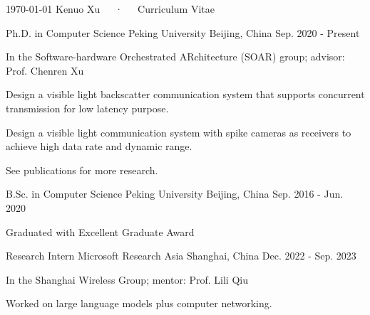 \documentclass[11pt, a4paper]{awesome-cv}
\begin{document}
\makecvheader

\makecvfooter
  {\today}
  {Kenuo Xu~~~·~~~Curriculum Vitae}
  {\thepage}



\begin{cventries}
	
	\cventry
	{Ph.D. in Computer Science}
	{Peking University}
	{Beijing, China}
	{Sep. 2020 - Present}
	{
		\begin{cvitems} %
			\item {In the Software-hardware Orchestrated ARchitecture (SOAR) group; advisor: Prof. Chenren Xu}
			\item {Design a visible light backscatter communication system that supports concurrent transmission for low latency purpose.}
			\item {Design a visible light communication system with spike cameras as receivers to achieve high data rate and dynamic range.}
			\item {See publications for more research.}
		\end{cvitems}
	}

	\cventry
	{B.Sc. in Computer Science} %
	{Peking University} %
	{Beijing, China} %
	{Sep. 2016 - Jun. 2020} %
	{
		\begin{cvitems} %
			\item {Graduated with Excellent Graduate Award}
		\end{cvitems}
	}

\end{cventries}

\begin{cventries}
	
	\cventry
	{Research Intern} %
	{Microsoft Research Asia} %
	{Shanghai, China} %
	{Dec. 2022 - Sep. 2023} %
	{
		\begin{cvitems} %
			\item {In the Shanghai Wireless Group; mentor: Prof. Lili Qiu}
			\item {Worked on large language models plus computer networking.}
		\end{cvitems}
	}
	
\end{cventries}
\end{document}
